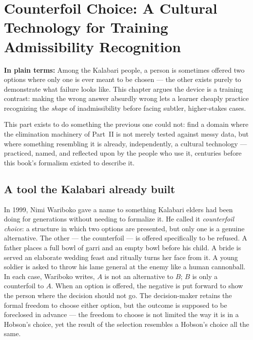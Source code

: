\chapter{Counterfoil Choice: A Cultural Technology for Training Admissibility Recognition}
\label{ch:counterfoil}

\begin{plainlanguage}
\textbf{In plain terms:} Among the Kalabari people, a person is sometimes offered two options where only one is ever meant to be chosen — the other exists purely to demonstrate what failure looks like. This chapter argues the device is a training contrast: making the wrong answer absurdly wrong lets a learner cheaply practice recognizing the \emph{shape} of inadmissibility before facing subtler, higher-stakes cases.
\end{plainlanguage}

\begin{chapternote}
This part exists to do something the previous one could not: find a domain where the elimination machinery of Part~II is not merely tested against messy data, but where something resembling it is already, independently, a cultural technology --- practiced, named, and reflected upon by the people who use it, centuries before this book's formalism existed to describe it.
\end{chapternote}

\section{A tool the Kalabari already built}

In 1999, Nimi Wariboko gave a name to something Kalabari elders had been doing for generations without needing to formalize it. He called it \emph{counterfoil choice}: a structure in which two options are presented, but only one is a genuine alternative. The other --- the counterfoil --- is offered specifically to be refused. A father places a full bowl of garri and an empty bowl before his child. A bride is served an elaborate wedding feast and ritually turns her face from it. A young soldier is asked to throw his lame general at the enemy like a human cannonball. In each case, Wariboko writes, $A$ is not an alternative to $B$; $B$ is only a counterfoil to $A$. When an option is offered, the negative is put forward to show the person where the decision should not go. The decision-maker retains the formal freedom to choose either option, but the outcome is supposed to be foreclosed in advance --- the freedom to choose is not limited the way it is in a Hobson's choice, yet the result of the selection resembles a Hobson's choice all the same.


